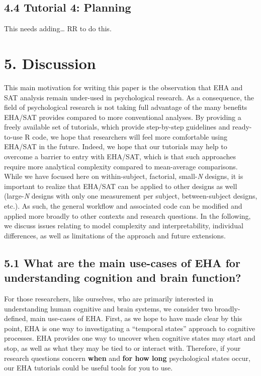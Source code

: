 \documentclass[
  man, donotrepeattitle,floatsintext]{apa6}
\begin{document}
\subsection{4.4 Tutorial 4: Planning}\label{tutorial-4-planning}

This needs adding\ldots{} RR to do this.

\section{5. Discussion}\label{discussion}

This main motivation for writing this paper is the observation that EHA and SAT analysis remain under-used in psychological research. As a consequence, the field of psychological research is not taking full advantage of the many benefits EHA/SAT provides compared to more conventional analyses. By providing a freely available set of tutorials, which provide step-by-step guidelines and ready-to-use R code, we hope that researchers will feel more comfortable using EHA/SAT in the future. Indeed, we hope that our tutorials may help to overcome a barrier to entry with EHA/SAT, which is that such approaches require more analytical complexity compared to mean-average comparisons. While we have focused here on within-subject, factorial, small-\emph{N} designs, it is important to realize that EHA/SAT can be applied to other designs as well (large-\emph{N} designs with only one measurement per subject, between-subject designs, etc.). As such, the general workflow and associated code can be modified and applied more broadly to other contexts and research questions. In the following, we discuss issues relating to model complexity and interpretability, individual differences, as well as limitations of the approach and future extensions.

\subsection{5.1 What are the main use-cases of EHA for understanding cognition and brain function?}\label{what-are-the-main-use-cases-of-eha-for-understanding-cognition-and-brain-function}

For those researchers, like ourselves, who are primarily interested in understanding human cognitive and brain systems, we consider two broadly-defined, main use-cases of EHA. First, as we hope to have made clear by this point, EHA is one way to investigating a ``temporal states'' approach to cognitive processes. EHA provides one way to uncover when cognitive states may start and stop, as well as what they may be tied to or interact with. Therefore, if your research questions concern \textbf{when} and \textbf{for how long} psychological states occur, our EHA tutorials could be useful tools for you to use.
\end{document}
